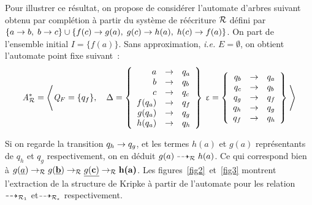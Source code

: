 \begin{example}
  \label{the_example}
  Pour illustrer ce résultat, on propose de considérer l'automate d'arbres suivant obtenu par complétion
  à partir du système de réécriture $\mathcal R$ défini par $\{ a \rightarrow b,\; b\rightarrow c \} \cup \{f(c) \rightarrow g(a),\; g(c) \rightarrow h(a),\; h(c) \rightarrow f(a)\}$.
  On part de l'ensemble initial $I=\{f(a)\}$.
  Sans approximation, \textit{i.e.} $E = \emptyset$, on obtient l'automate point fixe suivant~:
  {\small
    \[{\mathit A}_{\mathcal R}^*= \left\langle
      \mathit Q_F = \{q_f\},\quad
      \Delta = \left\{
        \begin{array}{rcl}
          a & \rightarrow & q_a \\
          b & \rightarrow & q_b \\
          c & \rightarrow & q_c \\
          f(q_a) & \rightarrow & q_f \\
          g(q_a) & \rightarrow & q_g \\
          h(q_a) & \rightarrow & q_h \\
        \end{array}
      \right\}\:
      \upvarepsilon= \left\{
        \begin{array}{rcl}
          q_b & \rightarrow & q_a \\
          q_c & \rightarrow & q_b \\
          q_g & \rightarrow & q_f \\
          q_h & \rightarrow & q_g \\
          q_f & \rightarrow & q_h \\
        \end{array}\right\}
      \:
    \right\rangle
    \]
  }
  
  \noindent Si on regarde la transition $q_h \rightarrow q_g$, et les termes $h(a)$ et $g(a)$ représentants de $q_h$ et $q_g$ respectivement, 
  on en déduit $g(a) \dashrightarrow_\mathcal R h(a)$. Ce qui correspond bien à
  $g(\underline{a}) \rightarrow_\mathcal R g(\underline{\textbf{b}}) \rightarrow_\mathcal R \underline{g(\textbf{c})} \rightarrow_\mathcal R \textbf{h(a)}$.
  Les figures~\ref{fig2}~et~\ref{fig3} montrent l'extraction de la structure de Kripke à partir de l'automate
  pour les relation $\dashrightarrow_{\mathcal R_1}$ et$\dashrightarrow_{\mathcal R_\epsilon}$ respectivement.
  

\end{example}
